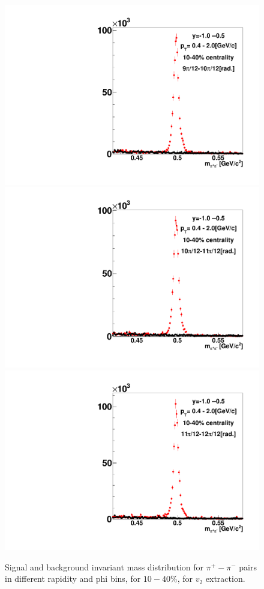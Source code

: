 \begin{figure}[h]
\includegraphics[width=0.14\linewidth]{chapterX/fig/ks_v2_sig/kf_ptslice0_cent1_ks_flow_phi10_rap2_check.pdf}
\includegraphics[width=0.14\linewidth]{chapterX/fig/ks_v2_sig/kf_ptslice0_cent1_ks_flow_phi11_rap2_check.pdf}
\includegraphics[width=0.14\linewidth]{chapterX/fig/ks_v2_sig/kf_ptslice0_cent1_ks_flow_phi12_rap2_check.pdf}




\caption{Signal and background invariant mass distribution for $\pi^{+}-\pi^{-}$ pairs in different rapidity and phi bins, for $10-40\%$, for $v_{2}$ extraction.}
\label{ks_v2_sig_raw}
\end{figure}


